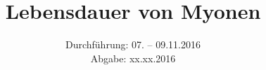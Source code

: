 
\usepackage{showframe}

\subject{Versuch 01}
\title{Lebensdauer von Myonen}
\date{Durchführung: 07. -- 09.11.2016 \\
      Abgabe: xx.xx.2016}



\maketitle
\newpage








\printbibliography


